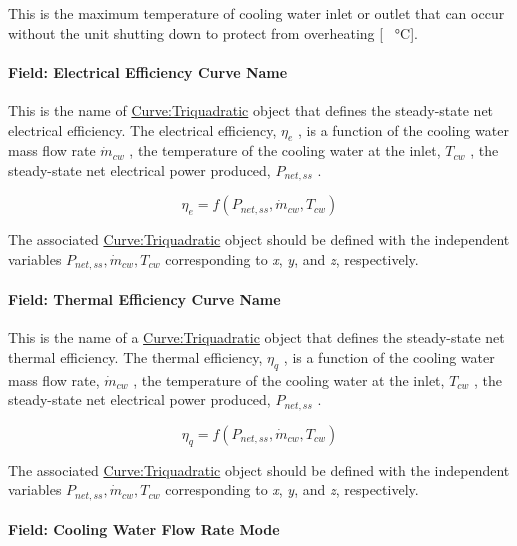This is the maximum temperature of cooling water inlet or outlet that can occur without the unit shutting down to protect from overheating {[} \SI{}{\celsius}{]}.

\paragraph{Field: Electrical Efficiency Curve Name}\label{field-electrical-efficiency-curve-name}

This is the name of \hyperref[curvetriquadratic]{Curve:Triquadratic} object that defines the steady-state net electrical efficiency. The electrical efficiency, \(\eta_e\) , is a function of the cooling water mass flow rate \(\dot m_{cw}\) , the temperature of the cooling water at the inlet, \(T_{cw}\) , the steady-state net electrical power produced, \(P_{net,ss}\) .

\begin{equation}
\eta_e = f\left( {{P_{net,ss}},{{\dot m}_{cw}},{T_{cw}}} \right)
\end{equation}

The associated \hyperref[curvetriquadratic]{Curve:Triquadratic} object should be defined with the independent variables \({P_{net,ss}},{\dot m_{cw}},{T_{cw}}\) corresponding to \emph{x}, \emph{y}, and \emph{z}, respectively.

\paragraph{Field: Thermal Efficiency Curve Name}\label{field-thermal-efficiency-curve-name}

This is the name of a \hyperref[curvetriquadratic]{Curve:Triquadratic} object that defines the steady-state net thermal efficiency. The thermal efficiency, \(\eta_q\) , is a function of the cooling water mass flow rate, \(\dot m_{cw}\) , the temperature of the cooling water at the inlet, \(T_{cw}\) , the steady-state net electrical power produced, \(P_{net,ss}\) .

\begin{equation}
{\eta_q} = f\left( {{P_{net,ss}},{{\dot m}_{cw}},{T_{cw}}} \right)
\end{equation}

The associated \hyperref[curvetriquadratic]{Curve:Triquadratic} object should be defined with the independent variables \({P_{net,ss}},{\dot m_{cw}},{T_{cw}}\) corresponding to \emph{x}, \emph{y}, and \emph{z}, respectively.

\paragraph{Field: Cooling Water Flow Rate Mode}\label{field-cooling-water-flow-rate-mode}

